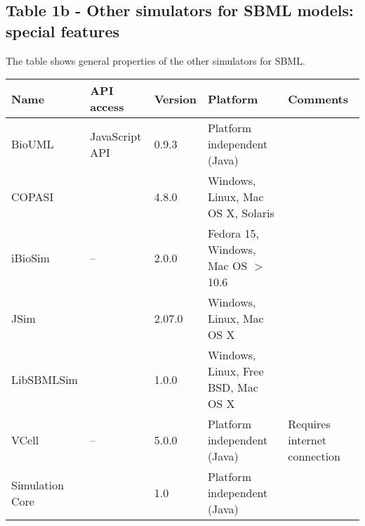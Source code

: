 \documentclass[10pt]{bmc_article}
\newenvironment{bmcformat}{\baselineskip20pt\sloppy\setboolean{publ}{false}}{\baselineskip20pt\sloppy}
\newcommand{\yes}{\ding{51}} %
\newcommand{\no}{--} %
\begin{document}
\begin{bmcformat}
\subsection*{Table 1b - Other simulators for SBML models: special features}
    The table shows general properties of the other simulators for SBML.
	\par \mbox{}
\begin{tabular}{lllll}
\toprule
Name 	        & API access & Version & Platform & Comments \\
\midrule
BioUML          & JavaScript API&0.9.3 & Platform independent (Java) &\\
COPASI          & \yes &4.8.0& Windows, Linux, Mac OS X, Solaris &\\
iBioSim         & \no&2.0.0 & Fedora 15, Windows, Mac OS $>$ 10.6 &\\
JSim            & \yes &2.07.0 & Windows, Linux, Mac OS X &\\
LibSBMLSim      & \yes &1.0.0 &Windows, Linux, Free BSD, Mac OS X&\\
VCell           & \no & 5.0.0 & Platform independent (Java) & Requires internet connection\\
Simulation Core & \yes & 1.0 & Platform independent (Java) &\\
\bottomrule
\end{tabular}


\end{bmcformat}
\end{document}
